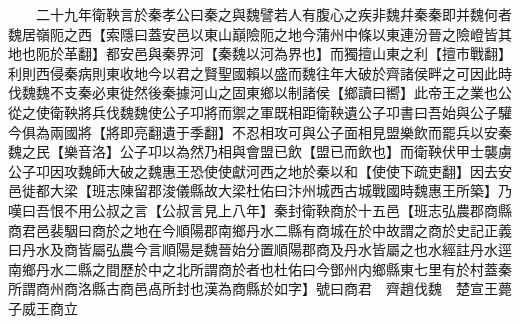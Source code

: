 　　二十九年衛鞅言於秦孝公曰秦之與魏譬若人有腹心之疾非魏幷秦秦即并魏何者魏居嶺阨之西【索隱曰蓋安邑以東山巔險阨之地今蒲州中條以東連汾晉之險嶝皆其地也阨於革翻】都安邑與秦界河【秦魏以河為界也】而獨擅山東之利【擅市戰翻】利則西侵秦病則東收地今以君之賢聖國賴以盛而魏往年大破於齊諸侯畔之可因此時伐魏魏不支秦必東徙然後秦據河山之固東鄉以制諸侯【鄉讀曰嚮】此帝王之業也公從之使衛鞅將兵伐魏魏使公子卭將而禦之軍既相距衛鞅遺公子卭書曰吾始與公子驩今俱為兩國將【將即亮翻遺于季翻】不忍相攻可與公子面相見盟樂飲而罷兵以安秦魏之民【樂音洛】公子卭以為然乃相與會盟已飲【盟已而飲也】而衛鞅伏甲士襲虜公子卭因攻魏師大破之魏惠王恐使使獻河西之地於秦以和【使使下疏吏翻】因去安邑徙都大梁【班志陳留郡浚儀縣故大梁杜佑曰汴州城西古城戰國時魏惠王所築】乃嘆曰吾恨不用公叔之言【公叔言見上八年】秦封衛鞅商於十五邑【班志弘農郡商縣商君邑裴駰曰商於之地在今順陽郡南鄉丹水二縣有商城在於中故謂之商於史記正義曰丹水及商皆屬弘農今言順陽是魏晉始分置順陽郡商及丹水皆屬之也水經註丹水逕南鄉丹水二縣之間歷於中之北所謂商於者也杜佑曰今鄧州内鄉縣東七里有於村蓋秦所謂商州商洛縣古商邑卨所封也漢為商縣於如字】號曰商君　齊趙伐魏　楚宣王薨子威王商立

